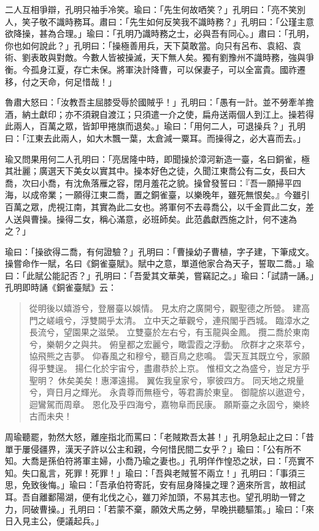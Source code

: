 二人互相爭辯，孔明只袖手冷笑。瑜曰：「先生何故哂笑？」孔明曰：「亮不笑別人，笑子敬不識時務耳。肅曰：「先生如何反笑我不識時務？」孔明曰：「公瑾主意欲降操，甚為合理。」瑜曰：「孔明乃識時務之士，必與吾有同心。」肅曰：「孔明，你也如何說此？」孔明曰：「操極善用兵，天下莫敢當。向只有呂布、袁紹、袁術、劉表敢與對敵。今數人皆被操滅，天下無人矣。獨有劉豫州不識時務，強與爭衡。今孤身江夏，存亡未保。將軍決計降曹，可以保妻子，可以全富貴。國祚遷移，付之天命，何足惜哉！」

魯肅大怒曰：「汝教吾主屈膝受辱於國賊乎！」孔明曰：「愚有一計。並不勞牽羊擔酒，納土獻印；亦不須親自渡江；只須遣一介之使，扁舟送兩個人到江上。操若得此兩人，百萬之眾，皆卸甲捲旗而退矣。」瑜曰：「用何二人，可退操兵？」孔明曰：「江東去此兩人，如大木飄一葉，太倉減一粟耳。而操得之，必大喜而去。」

瑜又問果用何二人孔明曰：「亮居隆中時，即聞操於漳河新造一臺，名曰銅雀，極其壯麗；廣選天下美女以實其中。操本好色之徒，久聞江東喬公有二女，長曰大喬，次曰小喬，有沈魚落雁之容，閉月羞花之貌。操曾發誓曰：『吾一願掃平四海，以成帝業；一願得江東二喬，置之銅雀臺，以樂晚年，雖死無恨矣。』今雖引百萬之眾，虎視江南，其實為此二女也。將軍何不去尋喬公，以千金買此二女，差人送與曹操。操得二女，稱心滿意，必班師矣。此范蠡獻西施之計，何不速為之？」

瑜曰：「操欲得二喬，有何證驗？」孔明曰：「曹操幼子曹植，字子建，下筆成文。操嘗命作一賦，名曰《銅雀臺賦》。賦中之意，單道他家合為天子，誓取二喬。」瑜曰：「此賦公能記否？」孔明曰：「吾愛其文華美，嘗竊記之。」瑜曰：「試請一誦。」孔明即時誦《銅雀臺賦》云：

\begin{quote}
從明後以嬉游兮，登層臺以娛情。
見太府之廣開兮，觀聖德之所營。
建高門之嵯峨兮，浮雙闕乎太清。
立中天之華觀兮，連飛閣乎西城。
臨漳水之長流兮，望園果之滋榮。
立雙臺於左右兮，有玉龍與金鳳。
攬二喬於東南兮，樂朝夕之與共。
俯皇都之宏麗兮，瞰雲霞之浮動。
欣群才之來萃兮，協飛熊之吉夢。
仰春風之和穆兮，聽百鳥之悲鳴。
雲天亙其既立兮，家願得乎雙逞。
揚仁化於宇宙兮，盡肅恭於上京。
惟桓文之為盛兮，豈足方乎聖明？
休矣美矣！惠澤遠揚。
翼佐我皇家兮，寧彼四方。
同天地之規量兮，齊日月之輝光。
永貴尊而無極兮，等君壽於東皇。
御龍旂以遨遊兮，迴鸞駕而周章。
恩化及乎四海兮，嘉物阜而民康。
願斯臺之永固兮，樂終古而未央！
\end{quote}

周瑜聽罷，勃然大怒，離座指北而罵曰：「老賊欺吾太甚！」孔明急起止之曰：「昔單于屢侵疆界，漢天子許以公主和親，今何惜民間二女乎？」瑜曰：「公有所不知。大喬是孫伯符將軍主婦，小喬乃瑜之妻也。」孔明佯作惶恐之狀，曰：「亮實不知。失口亂言，死罪！死罪！」瑜曰：「吾與老賊誓不兩立！」孔明曰：「事須三思，免致後悔。」瑜曰：「吾承伯符寄託，安有屈身降操之理？適來所言，故相試耳。吾自離鄱陽湖，便有北伐之心，雖刀斧加頭，不易其志也。望孔明助一臂之力，同破曹操。」孔明曰：「若蒙不棄，願效犬馬之勞，早晚拱聽驅策。」瑜曰：「來日入見主公，便議起兵。」

